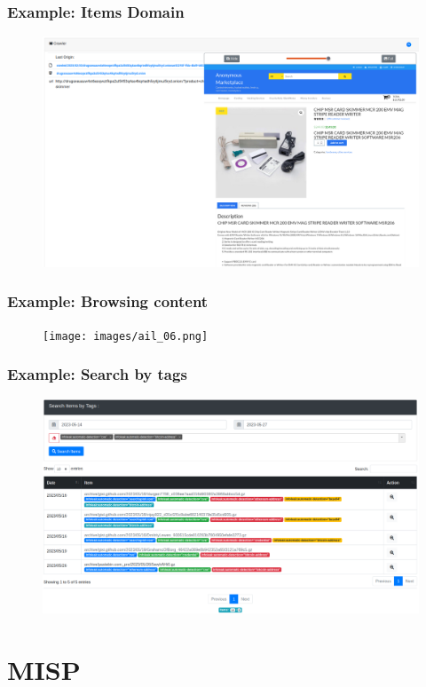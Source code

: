 \documentclass[aspectratio=169]{beamer}
\begin{document}
\begin{frame}
    \frametitle{Example: Items Domain}
    \begin{figure}
        \includegraphics[scale=0.22, angle=0]{screenshot/item_domain.png}
    \end{figure}
\end{frame}

\begin{frame}
    \frametitle{Example: Browsing content}
    \begin{figure}
        \texttt{[image: images/ail\_06.png]}
    \end{figure}
\end{frame}

\begin{frame}
    \frametitle{Example: Search by tags}
    \begin{figure}
        \includegraphics[scale=0.22, angle=0]{screenshot/tags_search_items.png}
    \end{figure}
\end{frame}
\section{MISP}
\end{document}
